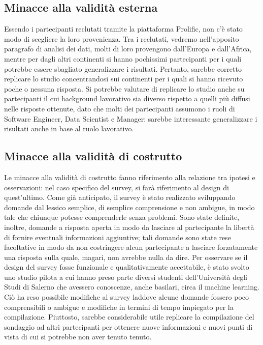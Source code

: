\subsection{Minacce alla validità esterna}
Essendo i partecipanti reclutati tramite la piattaforma Prolific, non c'è stato modo di scegliere la loro provenienza. Tra i reclutati, vedremo nell'apposito paragrafo di analisi dei dati, molti di loro provengono dall'Europa e dall'Africa, mentre per dagli altri continenti si hanno pochissimi partecipanti per i quali potrebbe essere sbagliato generalizzare i risultati. Pertanto, sarebbe corretto replicare lo studio concentrandosi sui continenti per i quali si hanno ricevuto poche o nessuna risposta. Si potrebbe valutare di replicare lo studio anche su partecipanti il cui background lavorativo sia diverso rispetto a quelli più diffusi nelle risposte ottenute, dato che molti dei partecipanti assumono i ruoli di Software Engineer, Data Scientist e Manager: sarebbe interessante generalizzare i risultati anche in base al ruolo lavorativo.\\
\subsection{Minacce alla validità di costrutto}
Le minacce alla validità di costrutto fanno riferimento alla relazione tra ipotesi e osservazioni: nel caso specifico del survey, si farà riferimento al design di quest'ultimo. Come già anticipato, il survey è stato realizzato sviluppando domande dal lessico semplice, di semplice comprensione e non ambigue, in modo tale che chiunque potesse comprenderle senza problemi. Sono state definite, inoltre, domande a risposta aperta in modo da lasciare al partecipante la libertà di fornire eventuali informazioni aggiuntive; tali domande sono state rese facoltative in modo da non costringere alcun partecipante a lasciare forzatamente una risposta sulla quale, magari, non avrebbe nulla da dire. Per osservare se il design del survey fosse funzionale e qualitativamente accettabile, è stato svolto uno studio pilota a cui hanno preso parte diversi studenti dell'Università degli Studi di Salerno che avessero conoscenze, anche basilari, circa il machine learning. Ciò ha reso possibile modifiche al survey laddove alcune domande fossero poco comprensibili o ambigue e modifiche in termini di tempo impiegato per la compilazione. Piuttosto, sarebbe considerabile utile replicare la compilazione del sondaggio ad altri partecipanti per ottenere nuove informazioni e nuovi punti di vista di cui si potrebbe non aver tenuto tenuto.\\
